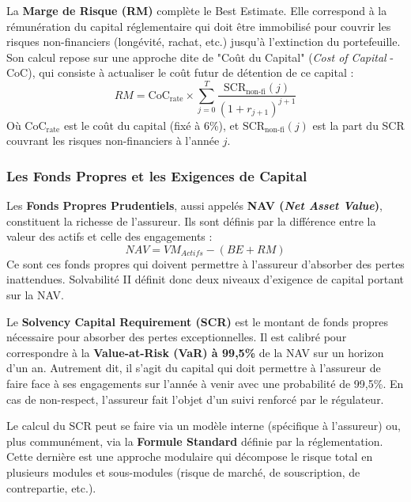 La \textbf{Marge de Risque (RM)} complète le Best Estimate. Elle correspond à la rémunération du capital réglementaire qui doit être immobilisé pour couvrir les risques non-financiers (longévité, rachat, etc.) jusqu'à l'extinction du portefeuille. Son calcul repose sur une approche dite de "Coût du Capital" (\textit{Cost of Capital} - CoC), qui consiste à actualiser le coût futur de détention de ce capital :
\begin{equation}
    RM = \text{CoC}_{\text{rate}} \times \sum_{j=0}^{T} \frac{\text{SCR}_{\text{non-fi}}(j)}{(1+r_{j+1})^{j+1}}
\end{equation}
Où $\text{CoC}_{\text{rate}}$ est le coût du capital (fixé à 6\%), et $\text{SCR}_{\text{non-fi}}(j)$ est la part du SCR couvrant les risques non-financiers à l'année $j$.


\subsubsection{Les Fonds Propres et les Exigences de Capital}

Les \textbf{Fonds Propres Prudentiels}, aussi appelés \textbf{NAV (\textit{Net Asset Value})}, constituent la richesse de l'assureur. Ils sont définis par la différence entre la valeur des actifs et celle des engagements :
\begin{equation}
    NAV = VM_{Actifs} - (BE + RM)
\end{equation}
Ce sont ces fonds propres qui doivent permettre à l'assureur d'absorber des pertes inattendues. Solvabilité II définit donc deux niveaux d'exigence de capital portant sur la NAV.

Le \textbf{Solvency Capital Requirement (SCR)} est le montant de fonds propres nécessaire pour absorber des pertes exceptionnelles. Il est calibré pour correspondre à la \textbf{Value-at-Risk (VaR) à 99,5\%} de la NAV sur un horizon d'un an. Autrement dit, il s'agit du capital qui doit permettre à l'assureur de faire face à ses engagements sur l'année à venir avec une probabilité de 99,5\%. En cas de non-respect, l'assureur fait l'objet d'un suivi renforcé par le régulateur.

Le calcul du SCR peut se faire via un modèle interne (spécifique à l'assureur) ou, plus communément, via la \textbf{Formule Standard} définie par la réglementation. Cette dernière est une approche modulaire qui décompose le risque total en plusieurs modules et sous-modules (risque de marché, de souscription, de contrepartie, etc.).

